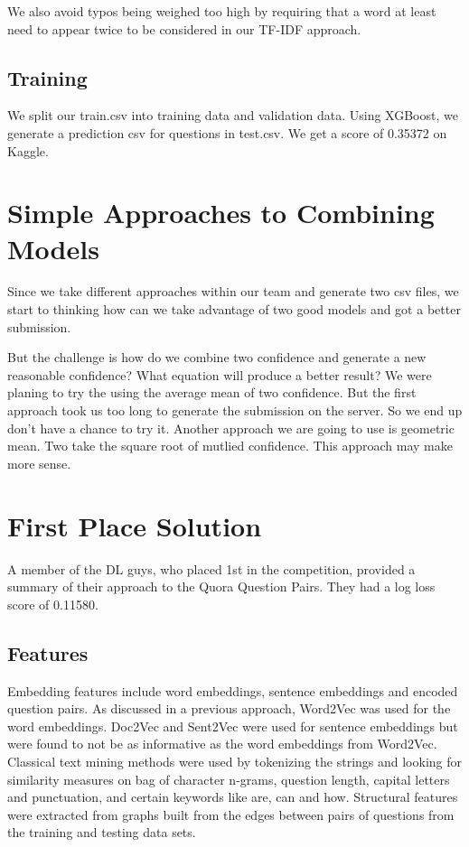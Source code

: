 \documentclass{article}
\begin{document}
We also avoid typos being weighed too high by requiring that a word at least need to appear twice to be considered in our TF-IDF approach. 

\subsection{Training}

We split our train.csv into training data and validation data. Using XGBoost, we generate a prediction csv for questions in test.csv. We get a score of 0.35372 on Kaggle.

\section{Simple Approaches to Combining Models}

Since we take different approaches within our team and generate two csv files, we start to thinking how can we take advantage of two good models and got a better submission. 

But the challenge is how do we combine two confidence and generate a new reasonable confidence? What equation will produce a better result? We were planing to try the using the average mean of two confidence. But the first approach took us too long to generate the submission on the server. So we end up don't have a chance to try it. Another approach we are going to use is geometric mean. Two take the square root of mutlied confidence. This approach may make more sense. 


\section{First Place Solution}

A member of the DL guys, who placed 1st in the competition, provided a summary
of their approach to the Quora Question Pairs. They had a log loss score of
0.11580.

\subsection{Features}

Embedding features include word embeddings, sentence embeddings and encoded
question pairs. As discussed in a previous approach, Word2Vec was used for the
word embeddings. Doc2Vec and Sent2Vec were used for sentence embeddings but
were found to not be as informative as the word embeddings from Word2Vec. Classical text mining methods were used by tokenizing the strings and looking
for similarity measures on bag of character n-grams, question length, capital
letters and punctuation, and certain keywords like are, can and how. Structural
features were extracted from graphs built from the edges between pairs of
questions from the training and testing data sets.
\end{document}
